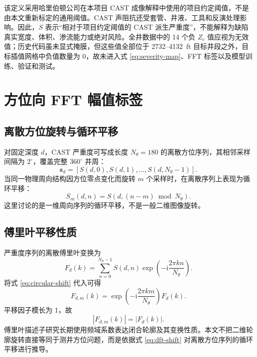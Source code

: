 该定义采用哈里伯顿公司在本项目 CAST 成像解释中使用的项目约定阈值，不是由本文重新标定的通用阈值。CAST 声阻抗还受套管、井液、工具和反演处理影响\cite{Froelich1982CementEvaluation,Wang2016AcousticCementMethods}。因此，$S$ 表示“相对于项目约定阈值的 CAST 派生严重度”，不能解释为缺陷真实宽度、体积、渗流能力或绝对风险。全井数据中的 14 个负 $Z_c$ 值应视为无效值；历史代码虽未显式掩膜，但这些值全部位于 2732--4132~ft 目标井段之外，目标插值网格中负值数量为 0，故未进入式 \ref{eq:severity-map}、FFT 标签以及模型训练、验证和测试。

\section{方位向 FFT 幅值标签}

\subsection{离散方位旋转与循环平移}

对固定深度 $d$，CAST 严重度可写成长度 $N_\theta=180$ 的离散方位序列，其相邻采样间隔为 $2^\circ$，覆盖完整 $360^\circ$ 井周：
\begin{equation}
  \mathbf{s}_d=\left[S(d,0),S(d,1),\ldots,S(d,N_\theta-1)\right].
\end{equation}
当同一物理周向结构因方位零点变化而旋转 $m$ 个采样时，在离散序列上表现为循环平移：
\begin{equation}
  S_m(d,n)=S\left(d,(n-m)\bmod N_\theta\right).
  \label{eq:circular-shift}
\end{equation}
这里讨论的是一维周向序列的循环平移，不是一般二维图像旋转。

\subsection{傅里叶平移性质}

严重度序列的离散傅里叶变换为
\begin{equation}
  F_d(k)=\sum_{n=0}^{N_\theta-1}S(d,n)
  \exp\left(-\mathrm{i}\frac{2\pi kn}{N_\theta}\right).
  \label{eq:dft-severity}
\end{equation}
将式 \ref{eq:circular-shift} 代入可得
\begin{equation}
  F_{d,m}(k)=
  \exp\left(-\mathrm{i}\frac{2\pi km}{N_\theta}\right)F_d(k).
  \label{eq:dft-shift}
\end{equation}
平移因子模长为 1，故
\begin{equation}
  \left|F_{d,m}(k)\right|=\left|F_d(k)\right|.
  \label{eq:magnitude-invariant}
\end{equation}
傅里叶描述子研究长期使用频域系数表达闭合轮廓及其变换性质\cite{Zahn1972FourierDescriptors,Persoon1977FourierDescriptors,Kuhl1982EllipticFourier}。本文不把二维轮廓旋转直接等同于测井方位问题，而是依据式 \ref{eq:dft-shift} 对离散方位序列的循环平移进行推导。

